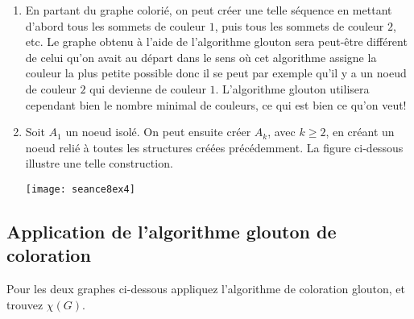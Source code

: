 \begin{solution}
  \begin{enumerate}
    \item En partant du graphe colorié, on peut créer une telle séquence en mettant d'abord tous les sommets de couleur $1$, puis tous les sommets de couleur $2$, etc. Le graphe obtenu à l'aide de l'algorithme glouton sera peut-être différent de celui qu'on avait au départ dans le sens où cet algorithme assigne la couleur la plus petite possible donc il se peut par exemple qu'il y a un noeud de couleur $2$ qui devienne de couleur $1$. L'algorithme glouton utilisera cependant bien le nombre minimal de couleurs, ce qui est bien ce qu'on veut!
    \item  Soit $A_1$ un noeud isolé. On peut ensuite créer $A_k$, avec $k \geq 2$, en créant un noeud relié à toutes les structures créées précédemment. La figure  ci-dessous illustre une telle construction.
    \begin{center}
    	\texttt{[image: seance8ex4]}
     \end{center}
  \end{enumerate}
\end{solution}


\subsection{Application de l'algorithme glouton de coloration}
Pour les deux graphes ci-dessous appliquez l'algorithme de coloration glouton, et trouvez $\chi(G)$.

